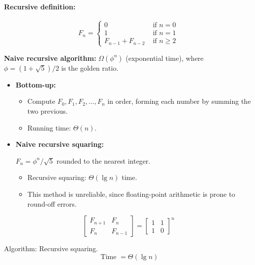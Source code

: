 \documentclass[11pt,toc=twocol]{elegantbook}
\begin{document}
\paragraph*{Recursive definition:}
$$
F_{n}= \begin{cases}0 & \text { if } n=0 \\ 1 & \text { if } n=1 \\ F_{n-1}+F_{n-2} & \text { if } n \geq 2\end{cases}
$$
\begin{note}
    \textbf{Naive recursive algorithm:} $\Omega\left(\phi^{n}\right)$ (exponential time), where $\phi=(1+\sqrt{5}) / 2$ is the golden ratio.
\end{note}
\begin{note}
    \begin{itemize}
        \item \textbf{Bottom-up:}
        \begin{itemize}
            \item Compute $F_{0}, F_{1}, F_{2}, \ldots, F_{n}$ in order, forming each number by summing the two previous. 
            \item Running time: $\Theta(n)$.
        \end{itemize}
        \item \textbf{Naive recursive squaring:}
        
        $F_{n}=\phi^{n} / \sqrt{5}$ rounded to the nearest integer.
        \begin{itemize}
            \item Recursive squaring: $\Theta(\lg n)$ time.
            \item This method is unreliable, since floating-point arithmetic is prone to round-off errors.
        \end{itemize}
    \end{itemize}
\end{note}
\begin{theorem}
    $$
\left[\begin{array}{cc}
F_{n+1} & F_{n} \\
F_{n} & F_{n-1}
\end{array}\right]=\left[\begin{array}{ll}
1 & 1 \\
1 & 0
\end{array}\right]^{n}
$$
\end{theorem}
\begin{note}
    Algorithm: Recursive squaring.
    $$
\text { Time }=\Theta(\lg n)
$$
\end{note}
\end{document}
